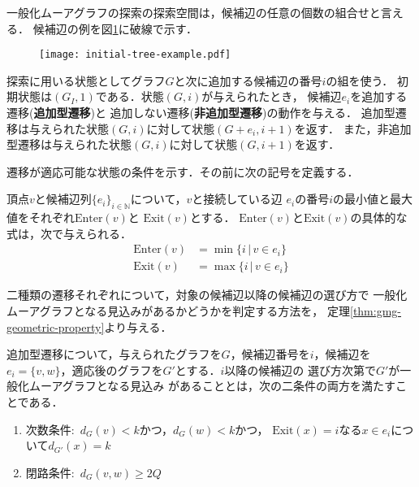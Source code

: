 一般化ムーアグラフの探索の探索空間は，候補辺の任意の個数の組合せと言える．
候補辺の例を図\ref{fig:feasible-edges-example}に破線で示す．

\begin{figure}
  \centering
  \begin{minipage}{.45\columnwidth}
    \texttt{[image: initial-tree-example.pdf]}
    \label{fig:initial-tree-example}
  \end{minipage}
  \hfill
  \begin{minipage}{.45\columnwidth}
    \def\svgwidth{\textwidth}
    
    \label{fig:feasible-edges-example}
  \end{minipage}
\end{figure}

探索に用いる状態としてグラフ$G$と次に追加する候補辺の番号$i$の組を使う．
初期状態は$(G_I,1)$である．状態$(G,i)$が与えられたとき，
候補辺$e_i$を追加する遷移(\textbf{追加型遷移})と
追加しない遷移(\textbf{非追加型遷移})の動作を与える．
追加型遷移は与えられた状態$(G,i)$に対して状態$(G+e_i,i+1)$を返す．
また，非追加型遷移は与えられた状態$(G,i)$に対して状態$(G,i+1)$を返す．

遷移が適応可能な状態の条件を示す．その前に次の記号を定義する．
\begin{definition}\rm
  頂点$v$と候補辺列$\{e_i\}_{i\in\mathbb{N}}$について，$v$と接続している辺
  $e_i$の番号$i$の最小値と最大値をそれぞれ$\text{Enter}(v)$と
  $\text{Exit}(v)$とする．
  $\text{Enter}(v)$と$\text{Exit}(v)$の具体的な式は，次で与えられる．
  \begin{equation}
    \label{eq:frontier}
    \begin{aligned}
    \text{Enter}(v) &= \min\{i\,|\,v\in e_i\} \\
    \text{Exit}(v) &= \max\{i\,|\,v\in e_i\}
    \end{aligned}
  \end{equation}
\end{definition}

二種類の遷移それぞれについて，対象の候補辺以降の候補辺の選び方で
一般化ムーアグラフとなる見込みがあるかどうかを判定する方法を，
定理\ref{thm:gmg-geometric-property}より与える．

\begin{corollary-without-proof}\rm
  \label{coll:basic-add-transition}
  追加型遷移について，与えられたグラフを$G$，候補辺番号を$i$，候補辺を
  $e_i=\{v,w\}$，適応後のグラフを$G'$とする．$i$以降の候補辺の
  選び方次第で$G'$が一般化ムーアグラフとなる見込み
  があることとは，次の二条件の両方を満たすことである．
  \begin{enumerate}
  \item 次数条件:\ $d_G(v)<k$かつ，$d_G(w)<k$かつ，
    $\text{Exit}(x)=i$なる$x\in e_i$について$d_{G'}(x)=k$
  \item 閉路条件:\ $d_G(v,w)\geq2Q$
  \end{enumerate}
\end{corollary-without-proof}

